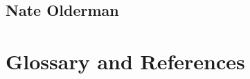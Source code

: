 \documentclass[12pt]{article}
\begin{document}
\subsection{Nate Olderman}


\section{Glossary and References}
\end{document}

